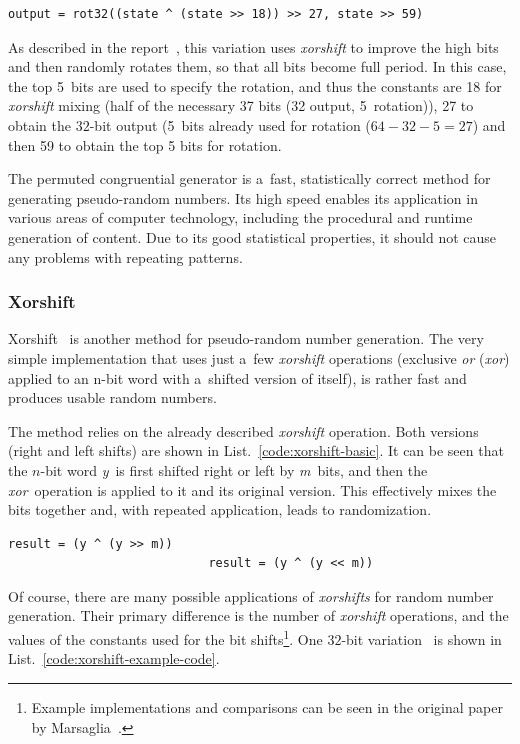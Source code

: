 \begin{lstlisting}[caption={Transformation function for PCG-XSH-RR.}, label={code:pcg-xsh-rr}]
        output = rot32((state ^ (state >> 18)) >> 27, state >> 59)
\end{lstlisting}

As described in the report~\cite{oneill:pcg2014}, this variation uses \emph{xorshift} to improve the high bits and then randomly rotates them, so that all bits become full period. In this case, the top 5~bits are used to specify the rotation, and thus the constants are 18 for \emph{xorshift} mixing (half of the necessary 37 bits (32 output, 5~rotation)), 27 to obtain the $32$-bit output (5~bits already used for rotation ($64 - 32 - 5 = 27$) and then 59 to obtain the top 5 bits for rotation.

The permuted congruential generator is a~fast, statistically correct method for generating pseudo-random numbers. Its high speed enables its application in various areas of computer technology, including the procedural and runtime generation of content. Due to its good statistical properties, it should not cause any problems with repeating patterns.


\subsubsection*{Xorshift}
Xorshift~\cite{marsaglia-xorshift} is another method for pseudo-random number generation. The very simple implementation that uses just a~few \emph{xorshift} operations (exclusive \emph{or} (\emph{xor}) applied to an n-bit word with a~shifted version of itself), is rather fast and produces usable random numbers.

The method relies on the already described \emph{xorshift} operation. Both versions (right and left shifts) are shown in List.~\ref{code:xorshift-basic}. It can be seen that the $n$-bit word \emph{y}~is first shifted right or left by \emph{m}~bits, and then the \emph{xor}~operation is applied to it and its original version. This effectively mixes the bits together and, with repeated application, leads to randomization.

\begin{lstlisting}[caption={Xorshift operation.}, label={code:xorshift-basic}]
                            result = (y ^ (y >> m))
                            result = (y ^ (y << m))
\end{lstlisting}

Of course, there are many possible applications of \emph{xorshifts} for random number generation. Their primary difference is the number of \emph{xorshift} operations, and the values of the constants used for the bit shifts\footnote{Example implementations and comparisons can be seen in the original paper by Marsaglia~\cite{marsaglia-xorshift}.}. One $32$-bit variation~\cite{marsaglia-xorshift} is shown in List.~\ref{code:xorshift-example-code}.

